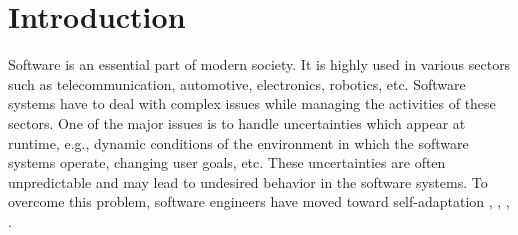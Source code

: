 \documentclass[a4paper,12pt]{article}
\begin{document}
\section{Introduction}
Software is an essential part of modern society. It is highly used in various sectors such as telecommunication, automotive, electronics, robotics, etc. Software systems have to deal with complex issues while managing the activities of these sectors. One of the major issues is to handle uncertainties which appear at runtime, e.g., dynamic conditions of the environment in which the software systems operate, changing user goals, etc. These uncertainties are often unpredictable and may lead to undesired behavior in the software systems. To overcome this problem, software engineers have moved toward self-adaptation \cite{SEFSASARR-2009}, \cite{SEFSASASRR-2013}, \cite{SEFSASRCITPOA-2017}, \cite{SEOSASAOTAFC-2017}.
\end{document}

